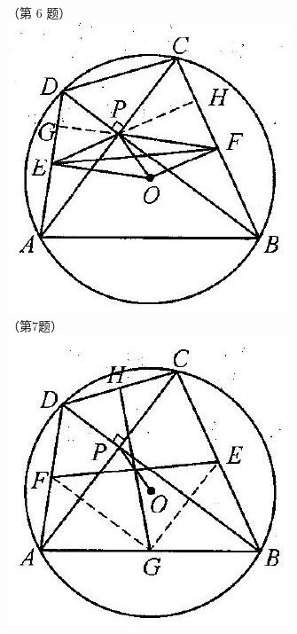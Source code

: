 \documentclass[10pt]{article}
\begin{document}
（第 6 题）\\
\includegraphics[max width=\textwidth, center]{2024_10_30_2c8f45efd4a519b08e1ag-183(3)}\\
（第7题）\\
\includegraphics[max width=\textwidth, center]{2024_10_30_2c8f45efd4a519b08e1ag-183(1)}\\
\end{document}
